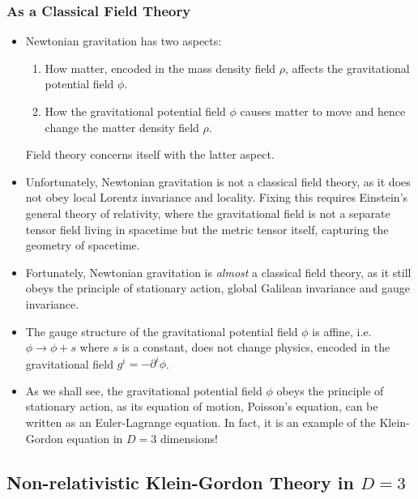 \documentclass{beamer}
\begin{document}
\begin{frame}
\frametitle{As a Classical Field Theory}

\begin{itemize}
\item Newtonian gravitation has two aspects:
\begin{enumerate}
\item How matter, encoded in the mass density field $\rho$, affects the gravitational potential field $\phi$.

\item How the gravitational potential field $\phi$ causes matter to move and hence change the matter density field $\rho$.
\end{enumerate}

Field theory concerns itself with the latter aspect.

\item Unfortunately, Newtonian gravitation is not a classical field theory, as it does not obey local Lorentz invariance and locality. Fixing this requires Einstein's general theory of relativity, where the gravitational field is not a separate tensor field living in spacetime but the metric tensor itself, capturing the geometry of spacetime.
\end{itemize}
\end{frame}

\begin{frame}
\begin{itemize}
\item Fortunately, Newtonian gravitation is \emph{almost} a classical field theory, as it still obeys the principle of stationary action, global Galilean invariance and gauge invariance.

\item The gauge structure of the gravitational potential field $\phi$ is affine, i.e. $\phi \to \phi + s$ where $s$ is a constant, does not change physics, encoded in the gravitational field $g^i = - \partial^i \phi$.

\item As we shall see, the gravitational potential field $\phi$ obeys the principle of stationary action, as its equation of motion, Poisson's equation, can be written as an Euler-Lagrange equation. In fact, it is an example of the Klein-Gordon equation in $D=3$ dimensions!
\end{itemize}
\end{frame}

\subsection{Non-relativistic Klein-Gordon Theory in $D=3$}
\end{document}
